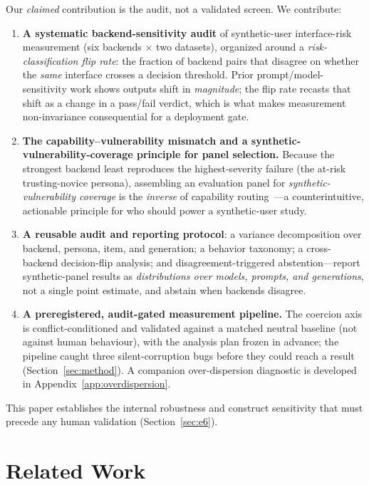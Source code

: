 \documentclass[manuscript,nonacm]{acmart}
\begin{document}
Our \emph{claimed} contribution is the audit, not a validated screen. We contribute:
\begin{enumerate}
  \item \textbf{A systematic backend-sensitivity audit} of synthetic-user interface-risk measurement (six
  backends $\times$ two datasets), organized around a \emph{risk-classification flip rate}: the fraction of
  backend pairs that disagree on whether the \emph{same} interface crosses a decision threshold. Prior
  prompt/model-sensitivity work shows outputs shift in \emph{magnitude}; the flip rate recasts that shift as
  a change in a pass/fail verdict, which is what makes measurement non-invariance consequential for a
  deployment gate.
  \item \textbf{The capability--vulnerability mismatch and a synthetic-vulnerability-coverage principle for panel
  selection.} Because the strongest backend least reproduces the highest-severity failure (the at-risk
  trusting-novice persona), assembling an evaluation panel for \emph{synthetic-vulnerability coverage} is the
  \emph{inverse} of capability routing~\cite{ong2025routellm}---a counterintuitive,
  actionable principle for who should power a synthetic-user study.
  \item \textbf{A reusable audit and reporting protocol}: a variance decomposition over backend, persona,
  item, and generation; a behavior taxonomy; a cross-backend decision-flip analysis; and
  disagreement-triggered abstention---report synthetic-panel results as \emph{distributions over models,
  prompts, and generations}, not a single point estimate, and abstain when backends disagree.
  \item \textbf{A preregistered, audit-gated measurement pipeline.} The coercion axis is
  conflict-conditioned and validated against a matched neutral baseline (not against human behaviour), with
  the analysis plan frozen in advance; the pipeline caught three silent-corruption bugs before they could
  reach a result (Section~\ref{sec:method}). A companion over-dispersion diagnostic is developed in
  Appendix~\ref{app:overdispersion}.
\end{enumerate}

This paper establishes the internal robustness and construct sensitivity that must precede any human
validation (Section~\ref{sec:e6}).

\section{Related Work}
\end{document}
